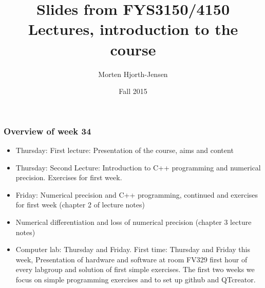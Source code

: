 \documentclass{beamer}
\begin{document}







\title{Slides from FYS3150/4150 Lectures, introduction to the course}


\author{Morten Hjorth-Jensen}

\date{Fall 2015
}

\begin{frame}
\titlepage
\end{frame}

\begin{frame}
\frametitle{Overview of week 34}

\begin{block}{}
\begin{itemize}
  \item Thursday: First lecture: Presentation of the course, aims and content

  \item Thursday: Second Lecture: Introduction to C++ programming and numerical precision. Exercises for first week. 

  \item Friday: Numerical precision and C++ programming, continued and exercises for first week (chapter 2 of lecture notes)

  \item Numerical differentiation and loss of numerical precision (chapter 3 lecture notes)

  \item Computer lab: Thursday and Friday. First time: Thursday and Friday this week, Presentation of hardware and software at room FV329 first hour of every labgroup and solution of first simple exercises. The first two weeks we focus on simple programming exercises and to set up github and QTcreator.
\end{itemize}

\noindent
\end{block}
\end{frame}
\end{document}
